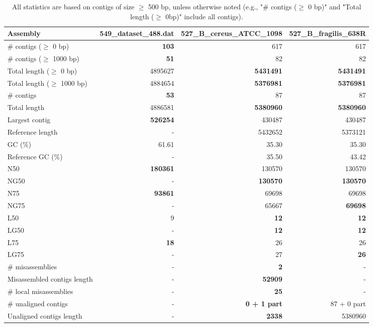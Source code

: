 \documentclass[12pt,a4paper]{article}
\begin{document}
\begin{table}[ht]
\begin{center}
\caption{All statistics are based on contigs of size $\geq$ 500 bp, unless otherwise noted (e.g., "\# contigs ($\geq$ 0 bp)" and "Total length ($\geq$ 0bp)" include all contigs).}
\begin{tabular}{|l*{3}{|r}|}
\hline
Assembly & 549\_dataset\_488.dat & 527\_B\_cereus\_ATCC\_1098 & 527\_B\_fragilis\_638R \\ \hline
\# contigs ($\geq$ 0 bp) & {\bf 103} & 617 & 617 \\ \hline
\# contigs ($\geq$ 1000 bp) & {\bf 51} & 82 & 82 \\ \hline
Total length ($\geq$ 0 bp) & 4895627 & {\bf 5431491} & {\bf 5431491} \\ \hline
Total length ($\geq$ 1000 bp) & 4884654 & {\bf 5376981} & {\bf 5376981} \\ \hline
\# contigs & {\bf 53} & 87 & 87 \\ \hline
Total length & 4886581 & {\bf 5380960} & {\bf 5380960} \\ \hline
Largest contig & {\bf 526254} & 430487 & 430487 \\ \hline
Reference length & - & 5432652 & 5373121 \\ \hline
GC (\%) & 61.61 & 35.30 & 35.30 \\ \hline
Reference GC (\%) & - & 35.50 & 43.42 \\ \hline
N50 & {\bf 180361} & 130570 & 130570 \\ \hline
NG50 & - & {\bf 130570} & {\bf 130570} \\ \hline
N75 & {\bf 93861} & 69698 & 69698 \\ \hline
NG75 & - & 65667 & {\bf 69698} \\ \hline
L50 & 9 & {\bf 12} & {\bf 12} \\ \hline
LG50 & - & {\bf 12} & {\bf 12} \\ \hline
L75 & {\bf 18} & 26 & 26 \\ \hline
LG75 & - & 27 & {\bf 26} \\ \hline
\# misassemblies & - & {\bf 2} & - \\ \hline
Misassembled contigs length & - & {\bf 52909} & - \\ \hline
\# local misassemblies & - & {\bf 25} & - \\ \hline
\# unaligned contigs & - & {\bf 0 + 1 part} & 87 + 0 part \\ \hline
Unaligned contigs length & - & {\bf 2338} & 5380960 \\ \hline

\end{tabular}
\end{center}
\end{table}
\end{document}
